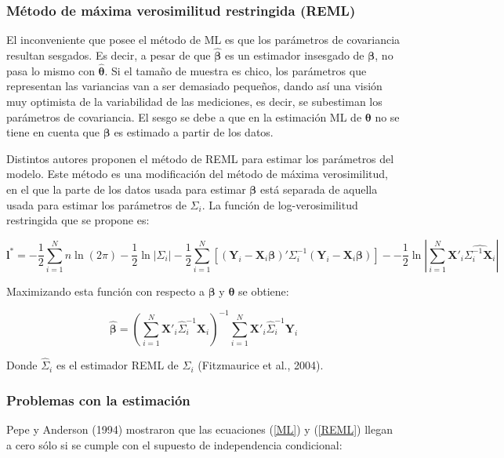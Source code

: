 \documentclass[spanish]{article}
\numberwithin{figure}{subsection}
\numberwithin{equation}{subsection}
\numberwithin{table}{subsection}
\begin{document}
\subsubsection{Método de máxima verosimilitud restringida (REML)}

El inconveniente que posee el método de ML es que los parámetros de covariancia
resultan sesgados. Es decir, a pesar de que $\bm{\hat{\beta}}$ es un estimador
insesgado de $\bm{\beta}$, no pasa lo mismo con $\bm{\hat{\theta}}$. Si el
tamaño de muestra es chico, los parámetros que representan las variancias van a
ser demasiado pequeños, dando así una visión muy optimista de la variabilidad de
las mediciones, es decir, se subestiman los parámetros de covariancia. El sesgo
se debe a que en la estimación ML de $\bm{\theta}$ no se tiene en cuenta que
$\bm{\beta}$ es estimado a partir de los datos.

Distintos autores proponen el método de REML para estimar los parámetros del
modelo. Este método es una modificación del método de máxima verosimilitud, en
el que la parte de los datos usada para estimar $\bm{\beta}$ está separada de
aquella usada para estimar los parámetros de $\bm{\varSigma}_i$. La función de
log-verosimilitud restringida que se propone es:

\begin{equation}
\label{REML}
	\bm{l}^* = -\frac{1}{2} \sum_{i=1}^{N}n \ln(2\pi) - \frac{1}{2}\ln|\bm{\varSigma}_i| -
	\frac{1}{2} \sum_{i=1}^{N} [(\bm{Y}_i - \bm{X}_i\bm{\beta})'
	\bm{\varSigma}_i^{-1} (\bm{Y}_i - \bm{X}_i\bm{\beta})] -
	- \frac{1}{2} \ln |\sum_{i=1}^{N} \bm{X}'_i \hat{\bm{\varSigma}_i^{-1} \bm{X}_i}|
\end{equation}

Maximizando esta función con respecto a $\bm{\beta}$ y $\bm{\theta}$ se obtiene:

\[ \hat{\bm{\beta}} = (\sum_{i=1}^{N} \bm{X}'_i \hat{\bm{\varSigma}}_i^{-1} \bm{X}_i)^{-1}
\sum_{i=1}^{N} \bm{X}'_i \hat{\bm{\varSigma}}_i^{-1} \bm{Y}_i\]

Donde $\hat{\bm{\varSigma}}_i$ es el estimador REML de ${\bm{\varSigma}_i}$ (Fitzmaurice et al., 2004).

\subsubsection{Problemas con la estimación}

Pepe y Anderson (1994) mostraron que las ecuaciones (\ref{ML}) y (\ref{REML})
llegan a cero sólo si se cumple con el supuesto de independencia condicional:
\end{document}
